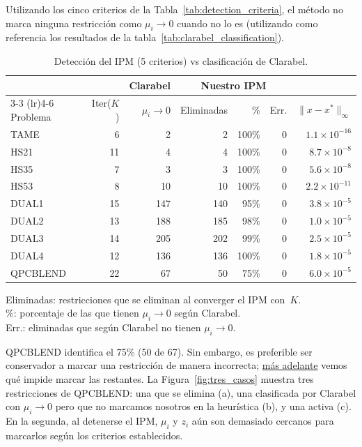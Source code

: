 Utilizando los cinco criterios de la Tabla~\ref{tab:detection_criteria}, el método no marca ninguna restricción como $\mu_i \to 0$ cuando no lo es (utilizando como referencia los resultados de la tabla~\ref{tab:clarabel_classification}).

\begin{table}[H]
\centering
\caption{Detección del IPM (5 criterios) vs clasificación de Clarabel.}
\label{tab:ipm_detection}
\begin{tabular}{l r r r r r r}
\toprule
         & & \multicolumn{1}{c}{Clarabel} & \multicolumn{3}{c}{Nuestro IPM} & \\
\cmidrule(lr){3-3} \cmidrule(lr){4-6}
Problema & Iter($K$) & $\mu_i\!\to\!0$ & Eliminadas & \% & Err. & $\|x-x^*\|_\infty$ \\
\midrule
TAME     &  6 &   2 &   2 & 100\% & 0 & $1.1\times10^{-16}$ \\
HS21     & 11 &   4 &   4 & 100\% & 0 & $8.7\times10^{-8}$ \\
HS35     &  7 &   3 &   3 & 100\% & 0 & $5.6\times10^{-8}$ \\
HS53     &  8 &  10 &  10 & 100\% & 0 & $2.2\times10^{-11}$ \\
DUAL1    & 15 & 147 & 140 &  95\% & 0 & $3.8\times10^{-5}$ \\
DUAL2    & 13 & 188 & 185 &  98\% & 0 & $1.0\times10^{-5}$ \\
DUAL3    & 14 & 205 & 202 &  99\% & 0 & $2.5\times10^{-5}$ \\
DUAL4    & 12 & 136 & 136 & 100\% & 0 & $1.8\times10^{-5}$ \\
QPCBLEND & 22 &  67 &  50 &  75\% & 0 & $6.0\times10^{-5}$ \\
\bottomrule
\end{tabular}

\vspace{0.3em}
\footnotesize
Eliminadas: restricciones que se eliminan al converger el IPM con~$K$. \\ \%: porcentaje de las que tienen $\mu_i \to 0$ según Clarabel. \\ Err.: eliminadas que según Clarabel no tienen $\mu_i \to 0$.
\end{table}

QPCBLEND identifica el 75\% (50 de 67).
Sin embargo, es preferible ser conservador a marcar una restricción de manera incorrecta; \hyperref[sec:analisis_criterios]{más adelante} vemos qué impide marcar las restantes.
La Figura~\ref{fig:tres_casos} muestra tres restricciones de QPCBLEND: una que se elimina (a), una clasificada por Clarabel con $\mu_i \to 0$ pero que no marcamos nosotros en la heurística (b), y una activa (c).
En la segunda, al detenerse el IPM, $\mu_i$ y $z_i$ aún son demasiado cercanos para marcarlos según los criterios establecidos.

